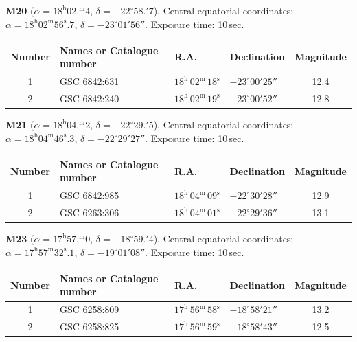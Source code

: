 \textbf{M20} ($\alpha = 18^{\mathrm{h}}02.^{\mathrm{m}}4$,
$\delta = -22^\circ 58.'7$). Central equatorial coordinates:
$\alpha = 18^{\mathrm{h}}02^{\mathrm{m}}56^{\mathrm{s}}.7$,
$\delta = -23^\circ 01' 56''$. Exposure time: 10\,sec.

\begin{center}
\begin{tabular}{clllc}
Number & Names or Catalogue number & R.A. & Declination & Magnitude \\
\hline
1 & GSC 6842:631 & $18^{\mathrm{h}}\,02^{\mathrm{m}}\,18^{\mathrm{s}}$ & $-23^\circ 00' 25''$ & 12.4 \\
2 & GSC 6842:240 & $18^{\mathrm{h}}\,02^{\mathrm{m}}\,19^{\mathrm{s}}$ & $-23^\circ 00' 52''$ & 12.8 \\
\end{tabular}
\end{center}

\textbf{M21} ($\alpha = 18^{\mathrm{h}}04.^{\mathrm{m}}2$,
$\delta = -22^\circ 29.'5$). Central equatorial coordinates:
$\alpha = 18^{\mathrm{h}}04^{\mathrm{m}}46^{\mathrm{s}}.3$,
$\delta = -22^\circ 29' 27''$. Exposure time: 10\,sec.

\begin{center}
\begin{tabular}{clllc}
Number & Names or Catalogue number & R.A. & Declination & Magnitude \\
\hline
1 & GSC 6842:985 & $18^{\mathrm{h}}\,04^{\mathrm{m}}\,09^{\mathrm{s}}$ & $-22^\circ 30' 28''$ & 12.9 \\
2 & GSC 6263:306 & $18^{\mathrm{h}}\,04^{\mathrm{m}}\,01^{\mathrm{s}}$ & $-22^\circ 29' 36''$ & 13.1 \\
\end{tabular}
\end{center}

\textbf{M23} ($\alpha = 17^{\mathrm{h}}57.^{\mathrm{m}}0$,
$\delta = -18^\circ 59.'4$). Central equatorial coordinates:
$\alpha = 17^{\mathrm{h}}57^{\mathrm{m}}32^{\mathrm{s}}.1$,
$\delta = -19^\circ 01' 08''$. Exposure time: 10\,sec.

\begin{center}
\begin{tabular}{clllc}
Number & Names or Catalogue number & R.A. & Declination & Magnitude \\
\hline
1 & GSC 6258:809 & $17^{\mathrm{h}}\,56^{\mathrm{m}}\,58^{\mathrm{s}}$ & $-18^\circ 58' 21''$ & 13.2 \\
2 & GSC 6258:825 & $17^{\mathrm{h}}\,56^{\mathrm{m}}\,59^{\mathrm{s}}$ & $-18^\circ 58' 43''$ & 12.5 \\
\end{tabular}
\end{center}

